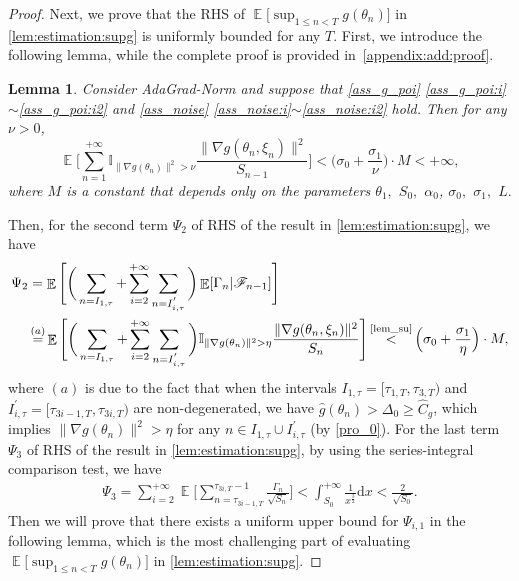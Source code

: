 \documentclass[standalone]{article}
\newcommand{\I}{\mathbb{I}}
\newtheorem{lem}{Lemma}[section]
\DeclareMathOperator{\Expect}{\mathbb{E}}
\begin{document}
\begin{proof}
 Next, we prove that the RHS of $\Expect\Big[\sup_{1\le n< T}g(\theta_{n})\Big]$ in \cref{lem:estimation:supg} is uniformly bounded for any \(T\). First, we introduce the following lemma, while the complete proof is provided in~\cref{appendix:add:proof}.
\begin{lem}\label{lem_su} 
Consider AdaGrad-Norm  and suppose that   \cref{ass_g_poi} \cref{ass_g_poi:i}$\sim$\cref{ass_g_poi:i2} and  \cref{ass_noise} \cref{ass_noise:i}$\sim$\cref{ass_noise:i2} hold. Then for any  $\nu>0$, %
\[
\Expect\Bigg[\sum_{n=1}^{+\infty}\I_{\|\nabla g(\theta_{n})\|^{2}>\nu}\frac{\|\nabla g(\theta_{n},\xi_{n})\|^{2}}{S_{n-1}}\Bigg]<\Big({\sigma_{0}}+{\frac{\sigma_{1}}{{\nu}}}\Big)\cdot M<+\infty,\]
where $M$ is a constant that  depends only on the parameters $\theta_{1},$ $S_{0},$ $\alpha_{0}$, $\sigma_{0},$ $\sigma_{1},$ $ L.$
\end{lem}
Then, for the second term $\Psi_{2}$ of RHS of the result in \cref{lem:estimation:supg}, we have
\begin{align}\label{inequ:phi_2}
\Psi_{2} &= \Expect\Bigg[\bigg(\sum_{n=I_{1,\tau}}+\sum_{i=2}^{+\infty}\sum_{n=I_{i,\tau}^{'}} \bigg)\Expect[\Gamma_n|\mathscr{F}_{n-1}]\Bigg] \notag \\
&\mathop{=}^{(a)} \Expect\Bigg[\bigg(\sum_{n=I_{1,\tau}}+\sum_{i=2}^{+\infty}\sum_{n=I_{i,\tau}^{'}} \bigg)\I_{\|\nabla g(\theta_{n})\|^{2}>\eta}\frac{\|\nabla g(\theta_{n},\xi_{n})\|^{2}}{S_{n}}\Bigg] \mathop{<}^{\text{\cref{lem_su}}}\Big({\sigma_{0}}+{\frac{\sigma_{1}}{{\eta}}}\Big)\cdot M,
\end{align}
where  $(a)$ is due to the fact that when the intervals $I_{1,\tau}=[\tau_{1,T}, \tau_{3,T})$ and   $I_{i,\tau}^{'}=[\tau_{3i-1,T}, \tau_{3i,T})$ are non-degenerated, we have $\hat{g}(\theta_{n}) > \Delta_0 \geq \hat{C}_{g}$,  which implies $\|\nabla g(\theta_{n})\|^{2} > \eta$ for any $ n \in I_{1,\tau}  \cup I_{i,\tau}^{'}$  (by \cref{pro_0}). 
For the last term \(\Psi_{3}\) of RHS of the result in \cref{lem:estimation:supg}, by using the series-integral comparison test, we have
\begin{align}\label{inequ:phi_3}
\Psi_{3} = \sum_{i=2}^{+\infty}\Expect\Bigg[\sum_{n=\tau_{3i-1,T}}^{\tau_{3i,T}-1}\frac{\Gamma_{n}}{\sqrt{S_{n}}}\Bigg]<\int_{S_{0}}^{+\infty}\frac{1}{x^{\frac{3}{2}}}\text{d}x<\frac{2}{\sqrt{S_{0}}}.
\end{align}
Then we will prove that there exists a uniform upper bound for $\Psi_{i,1}$ in the following lemma, which is the most challenging part of evaluating $\Expect\Big[\sup_{1\le n< T}g(\theta_{n})\Big]$ in \cref{lem:estimation:supg}.

\end{proof}
\end{document}
